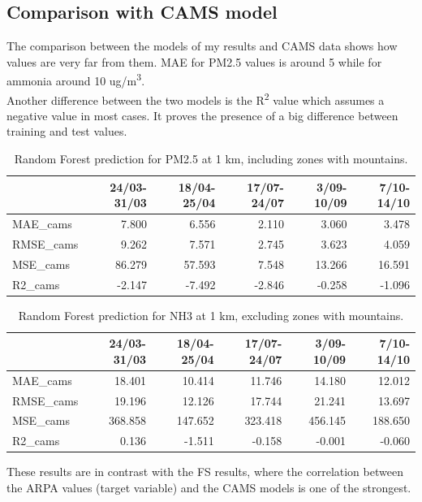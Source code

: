 \pagebreak
\subsection{Comparison with CAMS model}
The comparison between the models of my results and CAMS data shows how values are very far from them. MAE for PM2.5 values is around 5 while for ammonia around 10 ug/m\textsuperscript{3}. \\
Another difference between the two models is the R\textsuperscript{2} value which assumes a negative value in most cases. It proves the presence of a big difference between training and test values. 
\begin{table}[H]
\begin{tabular}{lrrrrr}
\toprule
  &  24/03-31/03 &  18/04-25/04 &  17/07-24/07 &  3/09-10/09 &  7/10-14/10 \\
\midrule
  MAE\_cams &        7.800 &        6.556 &        2.110 &       3.060 &       3.478 \\
  RMSE\_cams &        9.262 &        7.571 &        2.745 &       3.623 &       4.059 \\
   MSE\_cams &       86.279 &       57.593 &        7.548 &      13.266 &      16.591 \\
    R2\_cams &       -2.147 &       -7.492 &       -2.846 &      -0.258 &      -1.096 \\
\bottomrule
\end{tabular}
\caption{Random Forest prediction for PM2.5 at 1 km, including zones with mountains.}
\end{table}
\begin{table}[H]
\begin{tabular}{lrrrrr}
\toprule
  &  24/03-31/03 &  18/04-25/04 &  17/07-24/07 &  3/09-10/09 &  7/10-14/10 \\
\midrule
   MAE\_cams &       18.401 &       10.414 &       11.746 &      14.180 &      12.012 \\
  RMSE\_cams &       19.196 &       12.126 &       17.744 &      21.241 &      13.697 \\
   MSE\_cams &      368.858 &      147.652 &      323.418 &     456.145 &     188.650 \\
    R2\_cams &        0.136 &       -1.511 &       -0.158 &      -0.001 &      -0.060 \\
\bottomrule
\end{tabular}
\caption{Random Forest prediction for NH3 at 1 km, excluding zones with mountains.}
\end{table}
These results are in contrast with the FS results, where the correlation between the ARPA values (target variable) and the CAMS models is one of the strongest.

